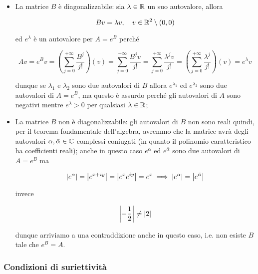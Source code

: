 \begin{itemize}
	\item La matrice $ B $ è diagonalizzabile: sia $ \lambda \in \mathbb{R} $ un suo autovalore, allora
	
	\begin{equation}
		B v = \lambda v \qcomma v \in \R^{2} \setminus {(0,0)}
	\end{equation}

	ed $ e^{\lambda} $ è un autovalore per $ A = e^{B} $ perché
	
	\begin{equation}
		A v = e^{B} v %
		= \left( \sum_{j=0}^{+\infty} \dfrac{B^{j}}{j!} \right) (v) %
		= \sum_{j=0}^{+\infty} \dfrac{B^{j} v}{j!} %
		= \sum_{j=0}^{+\infty} \dfrac{\lambda^{j} v}{j!} %
		= \left( \sum_{j=0}^{+\infty} \dfrac{\lambda^{j}}{j!} \right) (v) %
		= e^{\lambda} v
	\end{equation}

	dunque se $ \lambda_{1} $ e $ \lambda_{2} $ sono due autovalori di $ B $ allora $ e^{\lambda_{1}} $ ed $ e^{\lambda_{2}} $ sono due autovalori di $ A = e^{B} $, ma questo è assurdo perché gli autovalori di $ A $ sono negativi mentre $ e^{\lambda} > 0 $ per qualsiasi $ \lambda \in \mathbb{R} $;
	
	\item La matrice $ B $ non è diagonalizzabile: gli autovalori di $ B $ non sono reali quindi, per il teorema fondamentale dell'algebra, avremmo che la matrice avrà degli autovalori $ \alpha, \bar{\alpha} \in \mathbb{C} $ complessi coniugati (in quanto il polinomio caratteristico ha coefficienti reali); anche in questo caso $ e^{\alpha} $ ed $ e^{\bar{\alpha}} $ sono due autovalori di $ A = e^{B} $ ma
	
	\begin{equation}
		\abs{e^{\alpha}} = \abs{e^{x + i y}} = \abs{e^{x} e^{i y}} = e^{x} %
		\implies %
		\abs{e^{\alpha}} = \abs{e^{\bar{\alpha}}}
	\end{equation}

	invece
	
	\begin{equation}
		\abs{- \dfrac{1}{2}} \neq \abs{2}
	\end{equation}

	dunque arriviamo a una contraddizione anche in questo caso, i.e. non esiste $ B $ tale che $ e^{B} = A $.
\end{itemize}

\subsubsection{Condizioni di suriettività}

